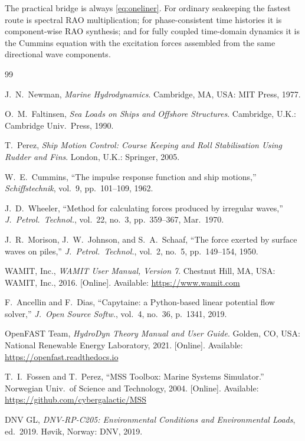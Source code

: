 \documentclass[journal,10pt,twocolumn]{IEEEtran}
\begin{document}
    The practical bridge is always \eqref{eq:oneliner}.
    For ordinary seakeeping the fastest route is spectral RAO multiplication;
    for phase-consistent time histories it is component-wise RAO synthesis;
    and for fully coupled time-domain dynamics it is the Cummins equation with the
    excitation forces assembled from the same directional wave components.

    \begin{thebibliography}{99}

        J.~N.~Newman,
        \emph{Marine Hydrodynamics}.
        Cambridge, MA, USA: MIT Press, 1977.

        O.~M.~Faltinsen,
        \emph{Sea Loads on Ships and Offshore Structures}.
        Cambridge, U.K.: Cambridge Univ.\ Press, 1990.

        T.~Perez,
        \emph{Ship Motion Control: Course Keeping and Roll Stabilisation Using Rudder and
        Fins}.
        London, U.K.: Springer, 2005.

        W.~E.~Cummins,
        ``The impulse response function and ship motions,''
        \emph{Schiffstechnik}, vol.~9, pp.~101--109, 1962.

        J.~D.~Wheeler,
        ``Method for calculating forces produced by irregular waves,''
        \emph{J.\ Petrol.\ Technol.}, vol.~22, no.~3, pp.~359--367, Mar.\ 1970.

        J.~R.~Morison, J.~W.~Johnson, and S.~A.~Schaaf,
        ``The force exerted by surface waves on piles,''
        \emph{J.\ Petrol.\ Technol.}, vol.~2, no.~5, pp.~149--154, 1950.

        WAMIT, Inc.,
        \emph{WAMIT User Manual, Version 7}.
        Chestnut Hill, MA, USA: WAMIT, Inc., 2016. [Online].
        Available: \url{https://www.wamit.com}

        F.~Ancellin and F.~Dias,
        ``Capytaine: a Python-based linear potential flow solver,''
        \emph{J.\ Open Source Softw.}, vol.~4, no.~36, p.~1341, 2019.

        OpenFAST Team,
        \emph{HydroDyn Theory Manual and User Guide}.
        Golden, CO, USA: National Renewable Energy Laboratory, 2021. [Online].
        Available: \url{https://openfast.readthedocs.io}

        T.~I.~Fossen and T.~Perez,
        ``MSS Toolbox: Marine Systems Simulator.''
        Norwegian Univ.\ of Science and Technology, 2004. [Online].
        Available: \url{https://github.com/cybergalactic/MSS}

        DNV GL,
        \emph{DNV-RP-C205: Environmental Conditions and Environmental Loads}, ed.\ 2019.
        H{\o}vik, Norway: DNV, 2019.

    \end{thebibliography}
\end{document}
